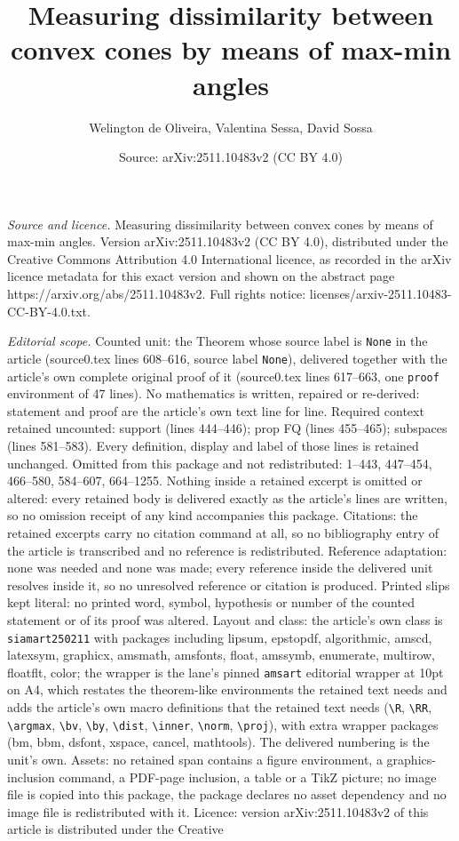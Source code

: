 \documentclass[10pt,a4paper]{amsart}
\title[Measuring dissimilarity between convex cones by means of max]{Measuring dissimilarity between convex cones by means of max-min angles}
\author{Welington de Oliveira, Valentina Sessa, David Sossa}
\date{Source: arXiv:2511.10483v2 (CC BY 4.0)}
\begin{document}
\maketitle

\noindent\emph{Source and licence.} Measuring dissimilarity between convex cones by means of max-min angles. Version arXiv:2511.10483v2 (CC BY 4.0), distributed under the Creative Commons Attribution 4.0 International licence, as recorded in the arXiv licence metadata for this exact version and shown on the abstract page https://arxiv.org/abs/2511.10483v2. Full rights notice: licenses/arxiv-2511.10483-CC-BY-4.0.txt.\par\smallskip

\noindent\textit{Editorial scope.} Counted unit: the Theorem whose source label is \texttt{None} in the article (source0.tex lines 608--616, source label \texttt{None}), delivered together with the article's own complete original proof of it (source0.tex lines 617--663, one \texttt{proof} environment of 47 lines). No mathematics is written, repaired or re-derived: statement and proof are the article's own text line for line. Required context retained uncounted: support (lines 444--446); prop FQ (lines 455--465); subspaces (lines 581--583). Every definition, display and label of those lines is retained unchanged. Omitted from this package and not redistributed: 1--443, 447--454, 466--580, 584--607, 664--1255. Nothing inside a retained excerpt is omitted or altered: every retained body is delivered exactly as the article's lines are written, so no omission receipt of any kind accompanies this package. Citations: the retained excerpts carry no citation command at all, so no bibliography entry of the article is transcribed and no reference is redistributed. Reference adaptation: none was needed and none was made; every reference inside the delivered unit resolves inside it, so no unresolved reference or citation is produced. Printed slips kept literal: no printed word, symbol, hypothesis or number of the counted statement or of its proof was altered. Layout and class: the article's own class is \texttt{siamart250211} with packages including lipsum, epstopdf, algorithmic, amscd, latexsym, graphicx, amsmath, amsfonts, float, amssymb, enumerate, multirow, floatflt, color; the wrapper is the lane's pinned \texttt{amsart} editorial wrapper at 10pt on A4, which restates the theorem-like environments the retained text needs and adds the article's own macro definitions that the retained text needs (\texttt{\textbackslash R}, \texttt{\textbackslash RR}, \texttt{\textbackslash argmax}, \texttt{\textbackslash bv}, \texttt{\textbackslash by}, \texttt{\textbackslash dist}, \texttt{\textbackslash inner}, \texttt{\textbackslash norm}, \texttt{\textbackslash proj}), with extra wrapper packages (bm, bbm, dsfont, xspace, cancel, mathtools). The delivered numbering is the unit's own. Assets: no retained span contains a figure environment, a graphics-inclusion command, a PDF-page inclusion, a table or a TikZ picture; no image file is copied into this package, the package declares no asset dependency and no image file is redistributed with it. Licence: version arXiv:2511.10483v2 of this article is distributed under the Creative 
\end{document}
